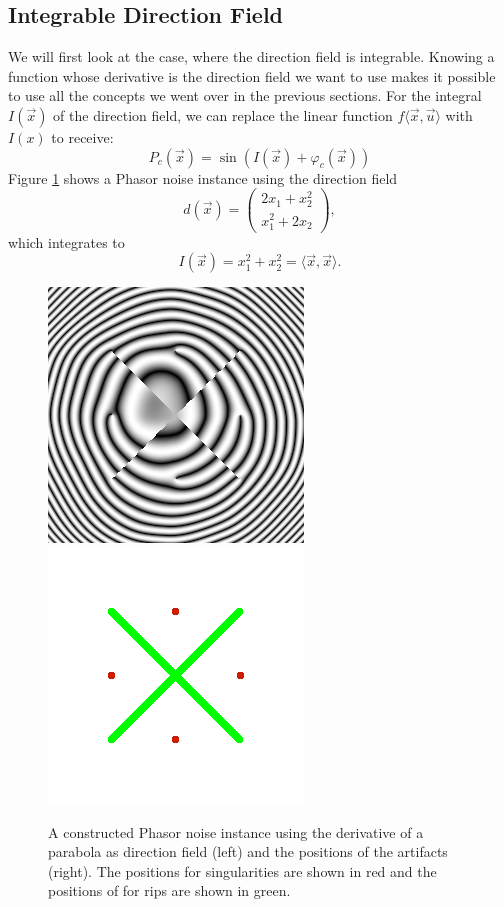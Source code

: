 \documentclass{utue} %
\begin{document}
\subsection{Integrable Direction Field}
We will first look at the case, where the direction field is integrable. Knowing a function whose derivative is the direction field we want to use makes it possible to use all the concepts we went over in the previous sections. For the integral $I(\vec{x})$ of the direction field, we can replace the linear function $f\langle\vec{x},\vec{u}\rangle$ with $I(x)$ to receive:
$$
P_c(\vec{x}) = \sin(I(\vec{x})+\varphi_c(\vec{x}))
$$
Figure \ref{fig:parabola} shows a Phasor noise instance using the direction field
$$
d(\vec{x}) = \begin{pmatrix}
2x_1+x_2^2\\
x_1^2+2x_2
\end{pmatrix},
$$
which integrates to
$$
I(\vec{x}) = x_1^2 + x_2^2 = \langle \vec{x},\vec{x} \rangle.
$$

\begin{figure}[ht]
  \centering
  \includegraphics[width=0.49\linewidth]{images/paraboloidDir}
  \includegraphics[width=0.49\linewidth]{images/combiningArtifactsPositions}
  \caption{A constructed Phasor noise instance using the derivative of a parabola as direction field (left) and the positions of the artifacts (right). The positions for singularities are shown in red and the positions of for rips are shown in green.}\label{fig:parabola}
\end{figure}
\end{document}
